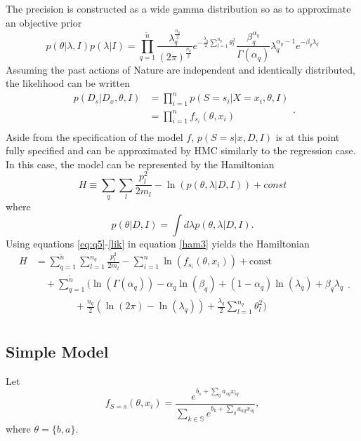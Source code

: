 \documentclass[a4paper,11pt, oneside]{article}
\theoremstyle{definition}
\begin{document}
	The precision is constructed as a wide gamma distribution so as to approximate an objective prior
	\begin{equation}
		p(\theta|\lambda,I)p(\lambda|I)
		= \prod_{q=1}^{\tilde{n}} \frac{\lambda_q^\frac{n_q}{2}}{(2\pi)^\frac{n_q}{2}}e^{-\frac{\lambda_q}{2}\sum_{l=1}^{n_q}\theta_l^2}\frac{\beta_q^{\alpha_q}}{\Gamma(\alpha_q)}\lambda_q^{\alpha_q-1}e^{-\beta_q \lambda_q}
		\label{eq:prior}
	\end{equation}
	Assuming the past actions of Nature are independent and identically distributed, the likelihood can be written 
	\begin{equation}
		\begin{split}
			p(D_s|D_x,\theta,I) &=\prod_{i=1}^{n}p(S = s_i|X = x_i,\theta,I)\\
			&=\prod_{i=1}^{n}f_{s_i}(\theta,x_i)\\
		\end{split}.
		\label{lik}
	\end{equation}
	Aside from the specification of the model $f$, $p(S= s|x,D,I)$ is at this point fully specified and can be approximated by HMC similarly to the regression case. In this case, the model can be represented by the Hamiltonian 
	\begin{equation}
		H \equiv  \sum_{q}\sum_{l}\frac{p_{l}^2}{2m_{l}}-\ln(p(\theta,\lambda|D,I))+const
		\label{ham3}
	\end{equation}
	where
	\begin{equation}
		p(\theta|D,I) = \int d\lambda p(\theta,\lambda|D,I).
	\end{equation}
	Using equations \eqref{eq:q5}-\eqref{lik} in equation \eqref{ham3} yields the Hamiltonian
	\begin{equation}
		\begin{split}
			H&=\sum_{q=1}^{\tilde{n}}\sum_{l=1}^{n_q}\frac{p_{l}^2}{2m_{l}}-\sum_{i=1}^{n}\ln(f_{s_i}(\theta,x_i))+\text{const}\\
			&\quad+\sum_{q=1}^{\tilde{n}}\bigg(\ln(\Gamma(\alpha_q))-\alpha_q\ln(\beta_q)+(1-\alpha_q)\ln(\lambda_q)+\beta_q\lambda_q\\
			&\qquad \qquad+\frac{n_q}{2}(\ln(2\pi)-\ln(\lambda_q))+\frac{\lambda_q}{2}\sum_{l=1}^{n_q}\theta_l^2\bigg)\\
		\end{split}.
		\label{ham2}
	\end{equation}
	
	\subsection{Simple Model}
	Let
	\begin{equation}
		f_{S = s}(\theta,x_i) = \frac{e^{b_s+\sum_{q}a_{sq}x_{iq}}}{\sum_{k\in \mathbb{S}}e^{b_k+\sum_{q}a_{kq}x_{iq}}},
		\label{eq:f1}
	\end{equation}
	where $\theta = \{b,a\}$.
	
\end{document}
